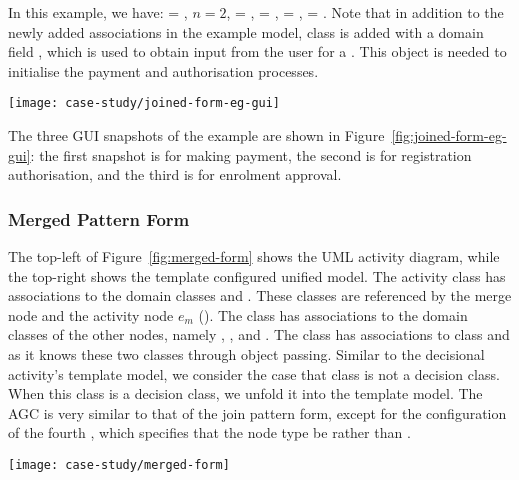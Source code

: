 In this example, we have:  = , $ n = 2 $,  = ,  = ,  = ,  = .
Note that in addition to the newly added associations in the example model, class  is added with a domain field , which is used to obtain input from the user for a . This  object is needed to initialise the payment and authorisation processes.

\begin{figure*}[ht]
	\begin{center}
		\texttt{[image: case-study/joined-form-eg-gui]}
	\end{center}
	\vspace{-0.4cm}
	\caption{The joined pattern form view of enrolment management activity.} %
	\label{fig:joined-form-eg-gui}
		\vspace{-0.3cm}
\end{figure*}

The three GUI snapshots of the example are shown in Figure~\ref{fig:joined-form-eg-gui}: the first snapshot is for making payment, the second is for registration authorisation, and the third is for enrolment approval.

\subsubsection{Merged Pattern Form} \label{sect:merged-pattern}

The top-left of Figure~\ref{fig:merged-form} shows the UML activity diagram, while the top-right shows the template configured unified model. 
The activity class  has associations to the domain classes  and . These classes are referenced by the merge node and the activity node $ e_m $ (\resp). The class  has associations to the domain classes of the other nodes, namely , , and . The class  has associations to class  and  as it knows these two classes through object passing.
%
Similar to the decisional activity's template model, we consider the case that class  is not a decision class. When this class is a decision class, we unfold it into the template model.
%
The AGC is very similar to that of the join pattern form, except for the configuration of the fourth , which specifies that the node type be  rather than .
%
\begin{figure*}[!ht]
	\begin{center}
		\texttt{[image: case-study/merged-form]}
	\end{center}
	\vspace{-0.4cm}
	\caption{The merged pattern form.} %
	\label{fig:merged-form}
	\vspace{-0.3cm}
\end{figure*}

